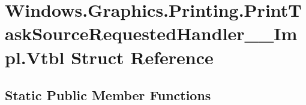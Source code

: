 \hypertarget{struct_windows_1_1_graphics_1_1_printing_1_1_print_task_source_requested_handler_____impl_1_1_vtbl}{}\section{Windows.\+Graphics.\+Printing.\+Print\+Task\+Source\+Requested\+Handler\+\_\+\+\_\+\+Impl.\+Vtbl Struct Reference}
\label{struct_windows_1_1_graphics_1_1_printing_1_1_print_task_source_requested_handler_____impl_1_1_vtbl}
\subsection*{Static Public Member Functions}
